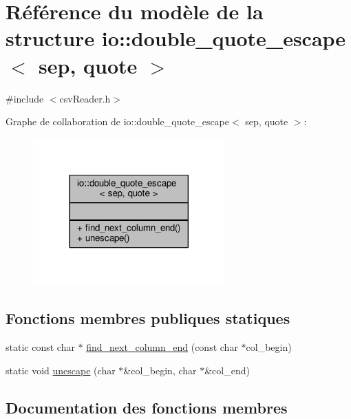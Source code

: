 \hypertarget{structio_1_1double__quote__escape}{}\section{Référence du modèle de la structure io\+:\+:double\+\_\+quote\+\_\+escape$<$ sep, quote $>$}
\label{structio_1_1double__quote__escape}


{\ttfamily \#include $<$csv\+Reader.\+h$>$}



Graphe de collaboration de io\+:\+:double\+\_\+quote\+\_\+escape$<$ sep, quote $>$\+:\nopagebreak
\begin{figure}[H]
\begin{center}
\leavevmode
\includegraphics[width=209pt]{structio_1_1double__quote__escape__coll__graph}
\end{center}
\end{figure}
\subsection*{Fonctions membres publiques statiques}
\begin{DoxyCompactItemize}
\item 
static const char $\ast$ \hyperlink{structio_1_1double__quote__escape_a30070914039ca8a20f716fbf53d68c41}{find\+\_\+next\+\_\+column\+\_\+end} (const char $\ast$col\+\_\+begin)
\item 
static void \hyperlink{structio_1_1double__quote__escape_a02e332751916fbdb7b35c238d690e580}{unescape} (char $\ast$\&col\+\_\+begin, char $\ast$\&col\+\_\+end)
\end{DoxyCompactItemize}


\subsection{Documentation des fonctions membres}
\mbox{\label{structio_1_1double__quote__escape_a30070914039ca8a20f716fbf53d68c41}} 
